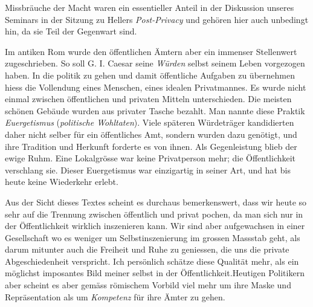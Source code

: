 \documentclass[a4paper,ngerman,11pt]{scrartcl}
\begin{document}
Missbräuche der Macht waren ein essentieller Anteil in der Diskussion unseres
Seminars in der Sitzung zu Hellers \emph{Post-Privacy} und gehören hier auch
unbedingt hin, da sie Teil der Gegenwart sind.

Im antiken Rom wurde den öffentlichen Ämtern aber ein immenser Stellenwert
zugeschrieben. So soll G. I. Caesar seine \emph{Würden} selbst seinem Leben
vorgezogen haben. In die politik zu gehen und damit öffentliche Aufgaben zu
übernehmen hiess die Vollendung eines Menschen, eines idealen Privatmannes. Es
wurde nicht einmal zwischen öffentlichen und privaten Mitteln
unterschieden. Die meisten schönen Gebäude wurden aus privater Tasche
bezahlt. Man nannte diese Praktik \emph{Euergetismus} (\emph{politische
Wohltaten}). Viele späteren Würdeträger kandidierten daher nicht selber für
ein öffentliches Amt, sondern wurden dazu genötigt, und ihre Tradition und
Herkunft forderte es von ihnen. Als Gegenleistung blieb der ewige Ruhm. Eine
Lokalgrösse war keine Privatperson mehr; die Öffentlichkeit verschlang
sie. Dieser Euergetismus war einzigartig in seiner Art, und hat bis heute keine
Wiederkehr erlebt.\cite{Veyne1989}

Aus der Sicht dieses Textes scheint es durchaus bemerkenswert, dass wir heute
so sehr auf die Trennung zwischen öffentlich und privat pochen, da man sich
nur in der Öffentlichkeit wirklich inszenieren kann. Wir sind aber
aufgewachsen in einer Gesellschaft wo es weniger um Selbstinszenierung im
grossen Massstab geht, als darum mitunter auch die Freiheit und Ruhe zu
geniessen, die uns die private Abgeschiedenheit verspricht. Ich persönlich
schätze diese Qualität mehr, als ein möglichst imposantes Bild meiner selbst
in der Öffentlichkeit.Heutigen Politikern aber scheint es aber gemäss
römischem Vorbild viel mehr um ihre Maske und Repräsentation als um
\emph{Kompetenz} für ihre Ämter zu gehen.



\end{document}

